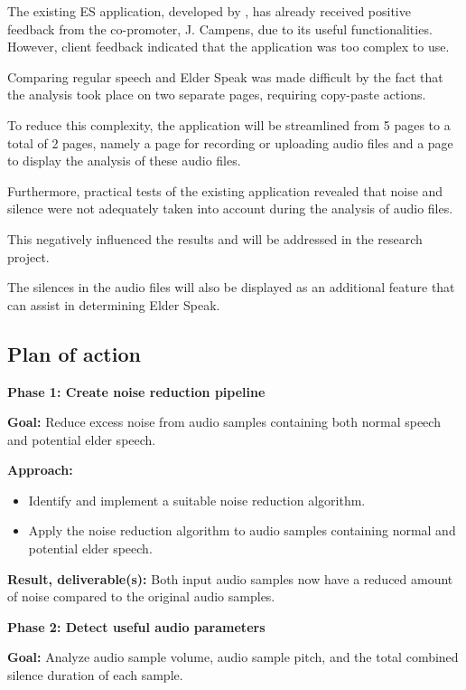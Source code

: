 \documentclass[english]{hogent-article}
\begin{document}
The existing ES application, developed by \cite{DeGussem2022}, has already received positive feedback from the co-promoter, J. Campens, due to its useful functionalities. However, client feedback indicated that the application was too complex to use.

Comparing regular speech and Elder Speak was made difficult by the fact that the analysis took place on two separate pages, requiring copy-paste actions.

To reduce this complexity, the application will be streamlined from 5 pages to a total of 2 pages, namely a page for recording or uploading audio files and a page to display the analysis of these audio files.

Furthermore, practical tests of the existing application revealed that noise and silence were not adequately taken into account during the analysis of audio files.

This negatively influenced the results and will be addressed in the research project.

The silences in the audio files will also be displayed as an additional feature that can assist in determining Elder Speak.

\subsection*{Plan of action}
\label{subsec:plan-of-action}

\textbf{Phase 1: Create noise reduction pipeline}

\textbf{Goal:} Reduce excess noise from audio samples containing both normal speech and potential elder speech.

\textbf{Approach:}
\begin{itemize}
    \item Identify and implement a suitable noise reduction algorithm.
    \item Apply the noise reduction algorithm to audio samples containing normal and potential elder speech.
\end{itemize}

\textbf{Result, deliverable(s):} Both input audio samples now have a reduced amount of noise compared to the original audio samples.

\textbf{Phase 2: Detect useful audio parameters}

\textbf{Goal:} Analyze audio sample volume, audio sample pitch, and the total combined silence duration of each sample.
\end{document}
